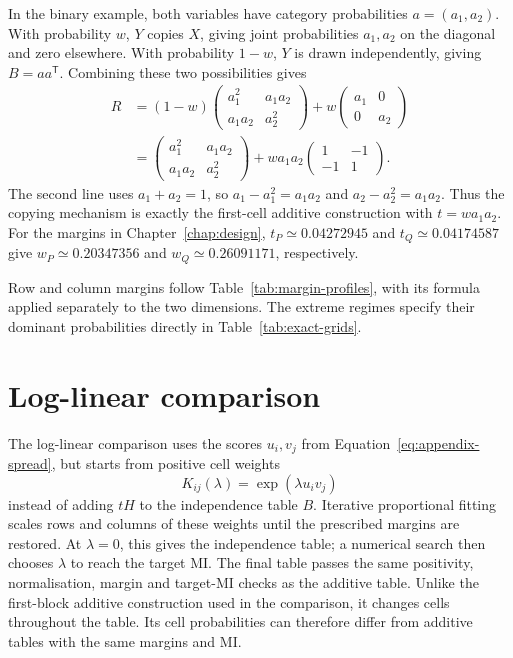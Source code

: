 \medskip
{}

In the binary example, both variables have category probabilities
\(a=(a_1,a_2)\). With probability \(w\), \(Y\) copies \(X\), giving
joint probabilities \(a_1,a_2\) on the diagonal and zero elsewhere.
With probability \(1-w\), \(Y\) is drawn independently, giving
\(B=aa^{\mathsf T}\). Combining these two possibilities
gives
\begin{align}
 R
 &= (1-w)
    \begin{pmatrix}a_1^2&a_1a_2\\a_1a_2&a_2^2\end{pmatrix}
    +w\begin{pmatrix}a_1&0\\0&a_2\end{pmatrix}\\
 &= \begin{pmatrix}a_1^2&a_1a_2\\a_1a_2&a_2^2\end{pmatrix}
    +wa_1a_2\begin{pmatrix}1&-1\\-1&1\end{pmatrix}.
 \label{eq:binary-copy-equivalence}
\end{align}
The second line uses \(a_1+a_2=1\), so
\(a_1-a_1^2=a_1a_2\) and \(a_2-a_2^2=a_1a_2\).
Thus the copying mechanism is exactly the first-cell additive
construction with \(t=wa_1a_2\). For the margins in Chapter~\ref{chap:design},
\(t_P\simeq0.04272945\) and \(t_Q\simeq0.04174587\) give
\(w_P\simeq0.20347356\) and \(w_Q\simeq0.26091171\), respectively.

\medskip

Row and column margins follow Table~\ref{tab:margin-profiles}, with its
formula applied separately to the two dimensions. The extreme regimes
specify their dominant probabilities directly in Table~\ref{tab:exact-grids}.

\section{Log-linear comparison}

The log-linear comparison uses the scores \(u_i,v_j\) from
Equation~\eqref{eq:appendix-spread}, but starts from positive cell weights
\begin{equation}
  K_{ij}(\lambda)=\exp(\lambda u_i v_j)
\end{equation}
instead of adding \(tH\) to the independence table \(B\). Iterative
proportional fitting \citep{deming1940} scales rows and columns of these
weights until the prescribed margins are restored. At \(\lambda=0\), this
gives the independence table; a numerical search then chooses \(\lambda\)
to reach the target MI\@. The final table passes the same positivity,
normalisation, margin and target-MI checks as the additive table. Unlike
the first-block additive construction used in the comparison, it changes
cells throughout the table. Its cell probabilities can therefore differ
from additive tables with the same margins and MI\@.

